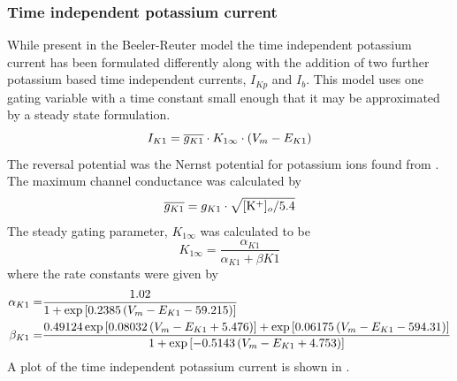 \subsubsection{Time independent potassium current}
While present in the Beeler-Reuter model the time independent potassium
current has been formulated differently along with the addition of two further
potassium based time independent currents, $I_{Kp}$ and $I_b$. This model uses
one gating variable with a time constant small enough that it may be
approximated by a steady state formulation.
\begin{equation}
  I_{K1}=\overline{g_{K1}}\cdot K_{1\infty}\cdot \left( V_m-E_{K1} \right)
\end{equation}
The reversal potential was the Nernst potential for potassium ions found from
. The maximum channel conductance was calculated by
\begin{equation}
  \overline{g_{K1}}=g_{K1}\cdot \sqrt{ [\mathrm{K^+}]_{o} /5.4}
\end{equation}
The steady gating parameter, $K_{1\infty}$ was calculated to be
\begin{equation}
  K_{1\infty}=\dfrac{\alpha_{K1}}{\alpha_{K1}+\beta{K1}}
\end{equation}
where the rate constants were given by
\begin{align}
  \alpha_{K1}=& \dfrac{1.02}{1+\exp\left[ 0.2385\left( V_m-E_{K1}-59.215 \right) \right]} \\
  \beta_{K1}=& \dfrac{{0.49124\exp\left[ 0.08032\left( V_m-E_{K1}+5.476 \right) \right]}+
    {\exp\left[ 0.06175\left( V_m-E_{K1}-594.31 \right) \right]}}{1+\exp\left[ -0.5143
    \left( V_m-E_{K1}+4.753 \right) \right]}
\end{align}
A plot of the time independent potassium current is shown in .
%
